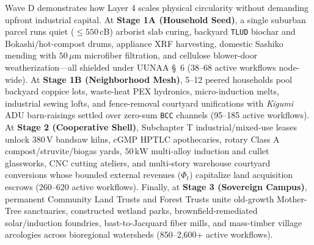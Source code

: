 Wave D demonstrates how Layer 4 scales physical circularity without demanding upfront industrial capital. At \textbf{Stage 1A (Household Seed)},
a single suburban parcel runs quiet ($\le 550\,\mathrm{cB}$) arborist slab curing, backyard \texttt{TLUD} biochar and Bokashi/hot-compost drums,
appliance XRF harvesting, domestic Sashiko mending with $50\,\mu\mathrm{m}$ microfiber filtration, and cellulose blower-door weatherization---all
shielded under UUNAA \S~6 (38--68 active workflows node-wide). At \textbf{Stage 1B (Neighborhood Mesh)}, 5--12 peered households pool backyard
coppice lots, waste-heat PEX hydronics, micro-induction melts, industrial sewing lofts, and fence-removal courtyard unifications with
\emph{Kigumi} ADU barn-raisings settled over zero-sum \texttt{BCC} channels (95--185 active workflows). At \textbf{Stage 2 (Cooperative Shell)},
Subchapter T industrial/mixed-use leases unlock $380\,\mathrm{V}$ bandsaw kilns, cGMP HPTLC apothecaries, rotary Class A compost/struvite/biogas
yards, $50\,\mathrm{kW}$ multi-alloy induction and cullet glassworks, CNC cutting ateliers, and multi-story warehouse courtyard conversions whose
bounded external revenues ($\Phi_t$) capitalize land acquisition escrows (260--620 active workflows). Finally, at \textbf{Stage 3 (Sovereign
Campus)}, permanent Community Land Trusts and Forest Trusts unite old-growth Mother-Tree sanctuaries, constructed wetland parks,
brownfield-remediated solar/induction foundries, bast-to-Jacquard fiber mills, and mass-timber village arcologies across bioregional watersheds
(850--2,600+ active workflows).

